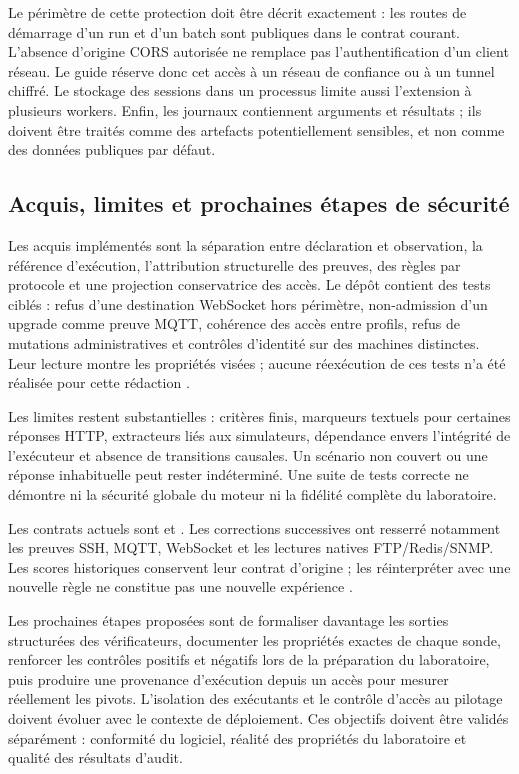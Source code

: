 \documentclass[11pt,a4paper]{article}
\DeclareRobustCommand{\code}[1]{{\small\path{#1}}}
\begin{document}
Le périmètre de cette protection doit être décrit exactement : les routes
de démarrage d'un run et d'un batch sont publiques dans le contrat courant.
L'absence d'origine CORS autorisée ne remplace pas l'authentification d'un
client réseau. Le guide réserve donc cet accès à un réseau de confiance ou
à un tunnel chiffré. Le stockage des sessions dans un processus limite aussi
l'extension à plusieurs workers. Enfin, les journaux contiennent arguments
et résultats ; ils doivent être traités comme des artefacts potentiellement
sensibles, et non comme des données publiques par défaut.

\subsection{Acquis, limites et prochaines étapes de sécurité}

Les acquis implémentés sont la séparation entre déclaration et observation,
la référence d'exécution, l'attribution structurelle des preuves, des règles
par protocole et une projection conservatrice des accès. Le dépôt contient
des tests ciblés : refus d'une destination WebSocket hors périmètre,
non-admission d'un upgrade comme preuve MQTT, cohérence des accès entre
profils, refus de mutations administratives et contrôles d'identité sur des
machines distinctes. Leur lecture montre les propriétés visées ; aucune
réexécution de ces tests n'a été réalisée pour cette rédaction
\cite{sec-tests-frontieres,sec-tests-identite,sec-tests-auth}.

Les limites restent substantielles : critères finis, marqueurs textuels pour
certaines réponses HTTP, extracteurs liés aux simulateurs, dépendance envers
l'intégrité de l'exécuteur et absence de transitions causales. Un scénario
non couvert ou une réponse inhabituelle peut rester indéterminé. Une suite
de tests correcte ne démontre ni la sécurité globale du moteur ni la
fidélité complète du laboratoire.

Les contrats actuels sont \code{strict-v3.16} et \code{evidence-v15}.
Les corrections successives ont resserré notamment les preuves SSH, MQTT,
WebSocket et les lectures natives FTP/Redis/SNMP. Les scores historiques
conservent leur contrat d'origine ; les réinterpréter avec une nouvelle règle
ne constitue pas une nouvelle expérience \cite{sec-contrat,sec-evaluation}.

Les prochaines étapes proposées sont de formaliser davantage les sorties
structurées des vérificateurs, documenter les propriétés exactes de chaque
sonde, renforcer les contrôles positifs et négatifs lors de la préparation
du laboratoire, puis produire une provenance d'exécution depuis un accès
pour mesurer réellement les pivots. L'isolation des exécutants et le
contrôle d'accès au pilotage doivent évoluer avec le contexte de déploiement.
Ces objectifs doivent être validés séparément : conformité du logiciel,
réalité des propriétés du laboratoire et qualité des résultats d'audit.
\end{document}
